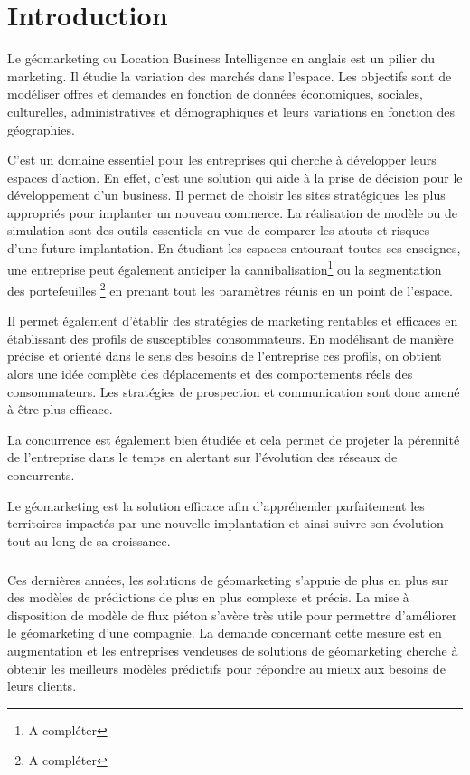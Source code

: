 \documentclass{themeensg}
\begin{document}
\chapter*{Introduction}

Le géomarketing ou Location Business Intelligence en anglais est un pilier du marketing. Il étudie la variation des marchés dans l’espace. Les objectifs sont de modéliser offres et demandes en fonction de données économiques, sociales, culturelles, administratives et démographiques et leurs variations en fonction des géographies.

C’est un domaine essentiel pour les entreprises qui cherche à développer leurs espaces d’action. En effet, c’est une solution qui aide à la prise de décision pour le développement d’un business. Il permet de choisir les sites stratégiques les plus appropriés pour implanter un nouveau commerce. La réalisation de modèle ou de simulation sont des outils essentiels en vue de comparer les atouts et risques d’une future implantation. En étudiant les espaces entourant toutes ses enseignes, une entreprise peut également anticiper la cannibalisation\footnote{A compléter} ou la segmentation des portefeuilles \footnote{A compléter} en prenant tout les paramètres réunis en un point de l’espace.

Il permet également d’établir des stratégies de marketing rentables et efficaces en établissant des profils de susceptibles consommateurs. En modélisant de manière précise et orienté dans le sens des besoins de l’entreprise ces profils, on obtient alors une idée complète des déplacements et des comportements réels des consommateurs. Les stratégies de prospection et communication sont donc amené à être plus efficace.

La concurrence est également bien étudiée et cela permet de projeter la pérennité de l’entreprise dans le temps en alertant sur l’évolution des réseaux de concurrents.

Le géomarketing est la solution efficace afin d’appréhender parfaitement les territoires impactés par une nouvelle implantation et ainsi suivre son évolution tout au long de sa croissance.

\paragraph*{}

Ces dernières années, les solutions de géomarketing s’appuie de plus en plus sur des modèles de prédictions de plus en plus complexe et précis. La mise à disposition de modèle de flux piéton s’avère très utile pour permettre d’améliorer le géomarketing d’une compagnie. La demande concernant cette mesure est en augmentation et les entreprises vendeuses de solutions de géomarketing cherche à obtenir les meilleurs modèles prédictifs pour répondre au mieux aux besoins de leurs clients.
\end{document}
